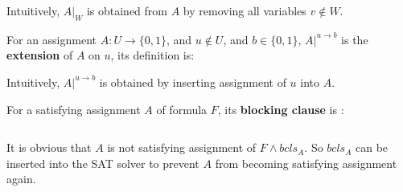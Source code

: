 \documentclass[journal]{IEEEtran}
\begin{document}
Intuitively, $A|_W$ is obtained from $A$ by removing all variables $v\notin W$.

For an assignment $A:U\to \{0,1\}$, and $u\notin U$, and $b\in \{0,1\}$, $A|^{u\to b}$ is the \textbf{extension} of $A$ on $u$,
its definition is:
\begin{displaymath}
\end{displaymath}

Intuitively, $A|^{u\to b}$ is obtained by inserting assignment of $u$ into $A$.



For a satisfying assignment $A$ of formula $F$,
its \textbf{blocking clause} is :

\begin{equation}\label{BCLS}
\end{equation}

It is obvious that $A$ is not satisfying assignment of $F\wedge bcls_A$.
So $bcls_A$ can be inserted into the SAT solver to prevent $A$ from becoming satisfying assignment again.
\end{document}
